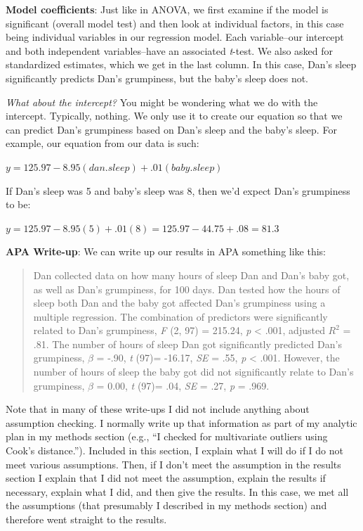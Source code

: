 \documentclass[
]{book}
\begin{document}
\textbf{Model coefficients}: Just like in ANOVA, we first examine if the model is significant (overall model test) and then look at individual factors, in this case being individual variables in our regression model. Each variable--our intercept and both independent variables--have an associated \emph{t}-test. We also asked for standardized estimates, which we get in the last column. In this case, Dan's sleep significantly predicts Dan's grumpiness, but the baby's sleep does not.

\emph{What about the intercept?} You might be wondering what we do with the intercept. Typically, nothing. We only use it to create our equation so that we can predict Dan's grumpiness based on Dan's sleep and the baby's sleep. For example, our equation from our data is such:

\(y = 125.97 - 8.95(dan.sleep) + .01(baby.sleep)\)

If Dan's sleep was 5 and baby's sleep was 8, then we'd expect Dan's grumpiness to be:

\(y = 125.97 - 8.95(5) + .01(8) = 125.97 - 44.75 + .08 = 81.3\)

\textbf{APA Write-up}: We can write up our results in APA something like this:

\begin{quote}
Dan collected data on how many hours of sleep Dan and Dan's baby got, as well as Dan's grumpiness, for 100 days. Dan tested how the hours of sleep both Dan and the baby got affected Dan's grumpiness using a multiple regression. The combination of predictors were significantly related to Dan's grumpiness, \emph{F} (2, 97) = 215.24, \emph{p} \textless{} .001, adjusted \(R^2\) = .81. The number of hours of sleep Dan got significantly predicted Dan's grumpiness, \(\beta\) = -.90, \emph{t} (97)= -16.17, \emph{SE} = .55, \emph{p} \textless{} .001. However, the number of hours of sleep the baby got did not significantly relate to Dan's grumpiness, \(\beta\) = 0.00, \emph{t} (97)= .04, \emph{SE} = .27, \emph{p} = .969.
\end{quote}

Note that in many of these write-ups I did not include anything about assumption checking. I normally write up that information as part of my analytic plan in my methods section (e.g., ``I checked for multivariate outliers using Cook's distance.''). Included in this section, I explain what I will do if I do not meet various assumptions. Then, if I don't meet the assumption in the results section I explain that I did not meet the assumption, explain the results if necessary, explain what I did, and then give the results. In this case, we met all the assumptions (that presumably I described in my methods section) and therefore went straight to the results.
\end{document}
